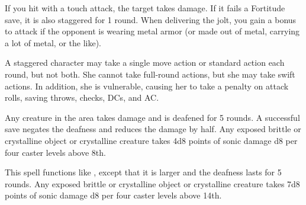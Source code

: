 \begin{spelleffect}
  If you hit with a touch attack, the target takes damage. If it fails a Fortitude save, it is also staggered for 1 round. When delivering the jolt, you gain a  bonus to attack if the opponent is wearing metal armor (or made out of metal, carrying a lot of metal, or the like).
\end{spelleffect}
\begin{spellnotes}
   A staggered character may take a single move action or standard action each round, but not both. She cannot take full-round actions, but she may take swift actions. In addition, she is vulnerable, causing her to take a  penalty on attack rolls, saving throws, checks, DCs, and AC.
\end{spellnotes}

\begin{spelleffect}
  Any creature in the area takes damage and is deafened for 5 rounds. A successful save negates the deafness and reduces the damage by half. Any exposed brittle or crystalline object or crystalline creature takes 4d8 points of sonic damage \add d8 per four caster levels above 8th.
\end{spelleffect}

\begin{spelleffect}
  This spell functions like , except that it is larger and the deafness lasts for 5 rounds. Any exposed brittle or crystalline object or crystalline creature takes 7d8 points of sonic damage \add d8 per four caster levels above 14th.
\end{spelleffect}

